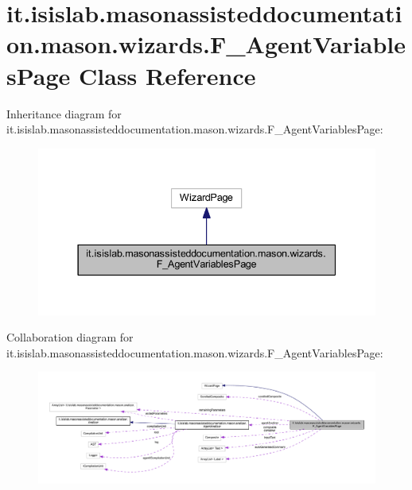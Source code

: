 \hypertarget{classit_1_1isislab_1_1masonassisteddocumentation_1_1mason_1_1wizards_1_1_f___agent_variables_page}{\section{it.\-isislab.\-masonassisteddocumentation.\-mason.\-wizards.\-F\-\_\-\-Agent\-Variables\-Page Class Reference}
\label{classit_1_1isislab_1_1masonassisteddocumentation_1_1mason_1_1wizards_1_1_f___agent_variables_page}
}


Inheritance diagram for it.\-isislab.\-masonassisteddocumentation.\-mason.\-wizards.\-F\-\_\-\-Agent\-Variables\-Page\-:
\nopagebreak
\begin{figure}[H]
\begin{center}
\leavevmode
\includegraphics[width=337pt]{classit_1_1isislab_1_1masonassisteddocumentation_1_1mason_1_1wizards_1_1_f___agent_variables_page__inherit__graph}
\end{center}
\end{figure}


Collaboration diagram for it.\-isislab.\-masonassisteddocumentation.\-mason.\-wizards.\-F\-\_\-\-Agent\-Variables\-Page\-:
\nopagebreak
\begin{figure}[H]
\begin{center}
\leavevmode
\includegraphics[width=350pt]{classit_1_1isislab_1_1masonassisteddocumentation_1_1mason_1_1wizards_1_1_f___agent_variables_page__coll__graph}
\end{center}
\end{figure}
